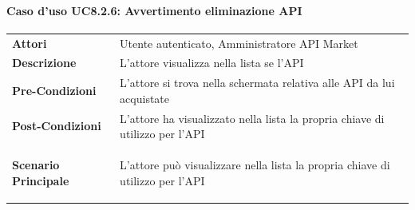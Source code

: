 \paragraph{Caso d'uso UC8.2.6: Avvertimento eliminazione API}
\label{UC8_2_6}

\begin{minipage}{\linewidth}
	\begin{tabular}{ l | p{11cm}}
		\hline
		\rowcolor{Gray}
		\multicolumn{2}{c}{UC8.2.6 - Avvertimento eliminazione API} \\
		\hline
		\textbf{Attori} & Utente autenticato, Amministratore API Market \\
		\textbf{Descrizione} & L'attore visualizza nella lista se l'API \\
		\textbf{Pre-Condizioni} & L'attore si trova nella schermata relativa alle API da lui acquistate \\
		\textbf{Post-Condizioni} & L'attore ha visualizzato nella lista la propria chiave di utilizzo per l'API \\
		\textbf{Scenario Principale} & 
		\begin{enumerate*}[label=(\arabic*.),itemjoin={\newline}]
			\item L'attore può visualizzare nella lista la propria chiave di utilizzo per l'API
		\end{enumerate*}\\
	\end{tabular}
\end{minipage}